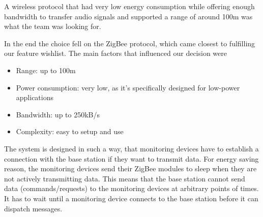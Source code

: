 A wireless protocol that had very low energy consumption while offering enough bandwidth to transfer audio signals and supported a range of around 100m  was what the team was looking for.

In the end the choice fell on the ZigBee protocol, which came closest to fulfilling our feature wishlist. The main factors that influenced our decision were

\begin{itemize}
\item Range: up to 100m
\item Power consumption: very low, as it’s specifically designed for low-power applications
\item Bandwidth: up to 250kB/s
\item Complexity: easy to setup and use
\end{itemize}

The system is designed in such a way, that monitoring devices have to establish a connection with the base station if they want to transmit data. For energy saving reason, the monitoring devices send their ZigBee modules to sleep when they are not actively transmitting data. This means that the base station cannot send data (commands/requests) to the monitoring devices at arbitrary points of times. It has to wait until a monitoring device connects to the base station before it can dispatch messages. 

